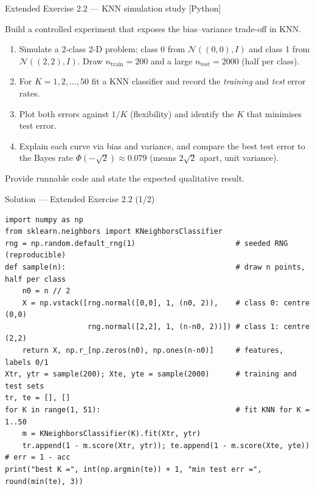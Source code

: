 \documentclass[aspectratio=169,11pt]{beamer}
\begin{document}
\begin{frame}{Extended Exercise 2.2 --- KNN simulation study [Python]}
\begin{longexercise}
Build a controlled experiment that exposes the bias--variance trade-off in KNN.
\begin{enumerate}\setlength\itemsep{1pt}
  \item Simulate a 2-class 2-D problem: class 0 from $\mathcal N((0,0),I)$ and class 1 from $\mathcal N((2,2),I)$. Draw $n_{\text{train}}=200$ and a large $n_{\text{test}}=2000$ (half per class).
  \item For $K=1,2,\ldots,50$ fit a KNN classifier and record the \emph{training} and \emph{test} error rates.
  \item Plot both errors against $1/K$ (flexibility) and identify the $K$ that minimises test error.
  \item Explain each curve via bias and variance, and compare the best test error to the Bayes rate $\Phi(-\sqrt2)\approx0.079$ (means $2\sqrt2$ apart, unit variance).
\end{enumerate}
Provide runnable code and state the expected qualitative result.
\end{longexercise}
\end{frame}

\begin{frame}[fragile]{Solution --- Extended Exercise 2.2 (1/2)}
\begin{solutionbox}
\begin{lstlisting}[basicstyle=\ttfamily\scriptsize]
import numpy as np
from sklearn.neighbors import KNeighborsClassifier
rng = np.random.default_rng(1)                       # seeded RNG (reproducible)
def sample(n):                                       # draw n points, half per class
    n0 = n // 2
    X = np.vstack([rng.normal([0,0], 1, (n0, 2)),    # class 0: centre (0,0)
                   rng.normal([2,2], 1, (n-n0, 2))]) # class 1: centre (2,2)
    return X, np.r_[np.zeros(n0), np.ones(n-n0)]     # features, labels 0/1
Xtr, ytr = sample(200); Xte, yte = sample(2000)      # training and test sets
tr, te = [], []
for K in range(1, 51):                               # fit KNN for K = 1..50
    m = KNeighborsClassifier(K).fit(Xtr, ytr)
    tr.append(1 - m.score(Xtr, ytr)); te.append(1 - m.score(Xte, yte))  # err = 1 - acc
print("best K =", int(np.argmin(te)) + 1, "min test err =", round(min(te), 3))
\end{lstlisting}
\end{solutionbox}
\end{frame}
\end{document}
